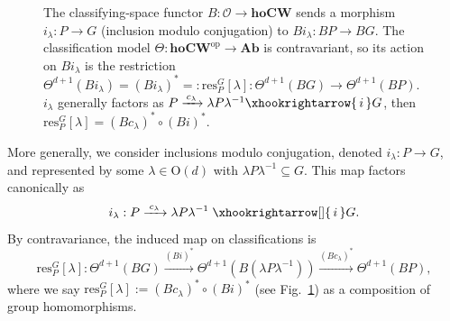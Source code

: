 \documentclass[aps,prx,reprint,superscriptaddress,twocolumn,amsmath,amssymb,amsfonts, nofootinbib]{revtex4-2}
\newcommand{\res}{\text{res}}
\theoremstyle{apsstyle}
\begin{document}
\begin{figure}[H]
    \centering
    \hspace*{1cm}
    \caption{The classifying-space functor $B:\mathcal O\to\mathbf{hoCW}$ sends a morphism $i_\lambda :P\to G$ (inclusion modulo conjugation) to $B i_\lambda :BP\to BG$. The classification model $\Theta:\mathbf{hoCW}^{\mathrm{op}}\to\mathbf{Ab}$ is contravariant, so its action on $B i_\lambda $ is the restriction
$\Theta^{d+1}(B i_\lambda )=(Bi_{\lambda})^{*}=:\res^{G}_{P}[\lambda ]:\Theta^{d+1}(BG)\to \Theta^{d+1}(BP)$. $i_\lambda $ generally factors as $P \xrightarrow{\,c_\lambda \,} \lambda P\lambda ^{-1} \xhookrightarrow{\,i\,} G$, then
$\res^{G}_{P}[\lambda ]=(Bc_{\lambda})^{*}\circ (Bi)^{*}$.}
    \label{fig:functor_maps}
\end{figure}



More generally, we consider inclusions modulo conjugation, denoted $i_{\lambda }:P\to G$, and represented by some $\lambda \in \mathrm{O}(d)$ with $\lambda P\lambda ^{-1}\subseteq G$. This map factors canonically as
\begin{equation*}
i_{\lambda }: P \xrightarrow[]{\;c_\lambda \;} \lambda P\lambda ^{-1}\; \xhookrightarrow[]{\,i\,} G.
\end{equation*}
By contravariance, the induced map on classifications is 
\begin{equation}
\res^{G}_{P}[\lambda ]:\Theta^{d+1}(BG)\xrightarrow{(Bi)^{*}}\Theta^{d+1}(B(\lambda P\lambda ^{-1}))
\xrightarrow{(Bc_\lambda )^{*}}\Theta^{d+1}(BP),
\label{eq:res_GP}
\end{equation}
where we say $\res^{G}_{P}[\lambda ]:=(Bc_\lambda )^{*}\circ (Bi)^{*}$ (see Fig.~\ref{fig:functor_maps}) as a composition of group homomorphisms. 
\end{document}

